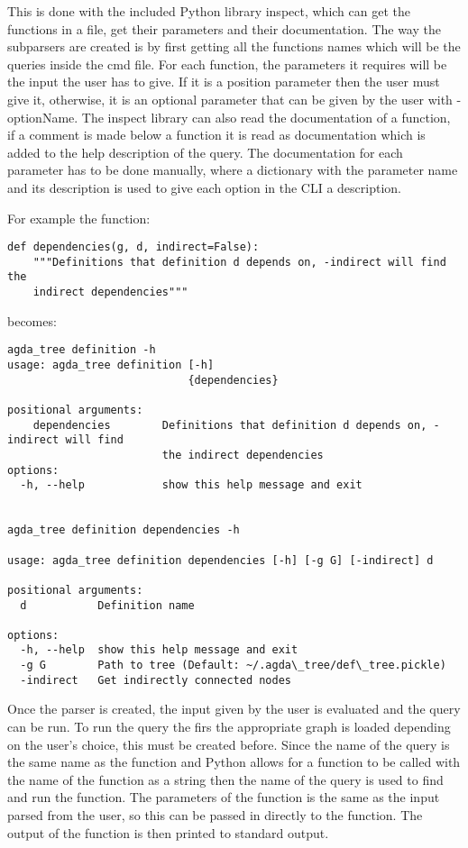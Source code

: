 This is done with the included Python library inspect, which can get the
functions in a file, get their parameters and their documentation. The way the
subparsers are created is by first getting all the functions names which will
be the queries inside the cmd file. For each function, the parameters it
requires will be the input the user has to give. If it is a position parameter
then the user must give it, otherwise, it is an optional parameter that can be
given by the user with -optionName. The inspect library can also read the
documentation of a function, if a comment is made below a function it is read
as documentation which is added to the help description of the query. The
documentation for each parameter has to be done manually, where a dictionary
with the parameter name and its description is used to give each option in the
CLI a description.

For example the function:

\begin{lstlisting}
def dependencies(g, d, indirect=False):
    """Definitions that definition d depends on, -indirect will find the
    indirect dependencies"""
\end{lstlisting}

becomes:

\begin{lstlisting}
agda_tree definition -h
usage: agda_tree definition [-h]
                            {dependencies}

positional arguments:
    dependencies        Definitions that definition d depends on, -indirect will find
                        the indirect dependencies
options:
  -h, --help            show this help message and exit


agda_tree definition dependencies -h

usage: agda_tree definition dependencies [-h] [-g G] [-indirect] d

positional arguments:
  d           Definition name

options:
  -h, --help  show this help message and exit
  -g G        Path to tree (Default: ~/.agda\_tree/def\_tree.pickle)
  -indirect   Get indirectly connected nodes
\end{lstlisting}

Once the parser is created, the input given by the user is evaluated and the
query can be run. To run the query the firs the appropriate graph is loaded
depending on the user's choice, this must be created before. Since the name of
the query is the same name as the function and Python allows for a function to
be called with the name of the function as a string then the name of the query
is used to find and run the function. The parameters of the function is the
same as the input parsed from the user, so this can be passed in directly to
the function. The output of the function is then printed to standard output.

